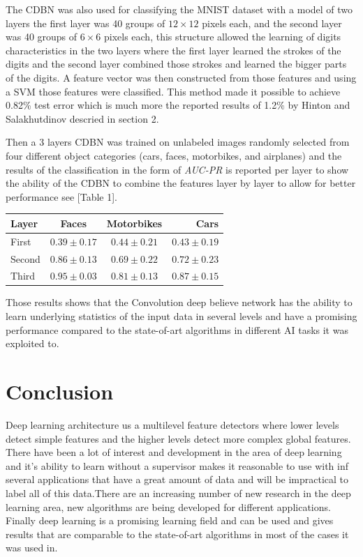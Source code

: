 \documentclass[12pt,twoside]{article}
\theoremstyle{plain}
\theoremstyle{definition}
\theoremstyle{remark}
\begin{document}
The CDBN was also used for classifying the MNIST dataset with a model of two layers  the first layer was 40 groups of $12 \times 12$ pixels each, and the second layer was 40 groups of $6 \times 6$ pixels each, this structure allowed the learning of digits characteristics in the two layers where the first layer learned the strokes of the digits and the second layer combined those strokes and learned the bigger parts of the digits. A feature vector was then constructed from those features and using a SVM those features were classified. This method made it possible to achieve 0.82\% test error which is much more the reported results of 1.2\% by Hinton and Salakhutdinov descried in section 2.

Then a 3 layers CDBN was trained on unlabeled images randomly selected from four different object categories (cars, faces, motorbikes, and airplanes) and the results of the classification in the form of \textit{AUC-PR} is reported per layer to show the ability of the CDBN to combine the features layer by layer to allow for better performance see [Table 1].\\

\begin{tabular}{|l c c r|}
\hline
    Layer & Faces & Motorbikes & Cars \\
\hline
First & $0.39 \pm 0.17$ & $0.44\pm0.21$  & $0.43\pm0.19$ \\
Second  & $0.86\pm0.13$ & $0.69\pm0.22$ &  $0.72\pm0.23$ \\
Third & $0.95\pm0.03$ & $0.81\pm0.13$ &  $0.87\pm0.15$ \\
\hline   
\end{tabular}


Those results shows that the Convolution deep believe network has the ability to learn underlying statistics of the input data in several levels and have a promising performance compared to the state-of-art algorithms in different AI tasks it was exploited to.

\section{Conclusion}
\label{sec:concl}
Deep learning architecture us a multilevel feature detectors where lower levels detect simple features and the higher levels detect more complex global features. There have been a lot of interest and development in the area of deep learning and it's ability to learn without a supervisor makes it reasonable to use with inf several applications that have a great amount of data and will be impractical to label all of this data.There are an increasing number of new research in the deep learning area, new algorithms are being developed for different applications. Finally deep learning is a promising learning field and can be used and gives results that are comparable to the state-of-art algorithms in most of the cases it was used in.
\end{document}
